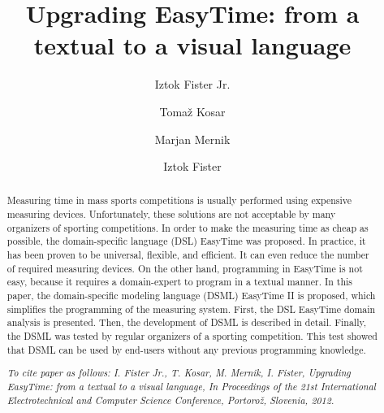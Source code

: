 \documentclass[preprint, prX]{revtex4}
\begin{document}
\begin{abstract}
Measuring time in mass sports competitions is usually performed using expensive measuring devices. Unfortunately, these solutions are not acceptable by many organizers of sporting competitions. In order to make the measuring time as cheap as possible, the domain-specific language (DSL) EasyTime was proposed. In practice, it has been proven to be universal, flexible, and efficient. It can even reduce the number of required measuring devices. On the other hand, programming in EasyTime is not easy, because it requires a domain-expert to program in a textual manner. In this paper, the domain-specific modeling language (DSML) EasyTime II is proposed, which simplifies the programming of the measuring system. First, the DSL EasyTime domain analysis is presented. Then, the development of DSML is described in detail. Finally, the DSML was tested by regular organizers of a sporting competition. This test showed that DSML can be used by end-users without any previous programming knowledge.

\textit{To cite paper as follows: I. Fister Jr., T. Kosar, M. Mernik, I. Fister, Upgrading EasyTime: from a textual to a visual language, In {\em Proceedings of the 21st International Electrotechnical and Computer Science Conference}, Portoro\v{z}, Slovenia, 2012.
}

\end{abstract}

\title{Upgrading EasyTime: from a textual to a visual language}


\author{Iztok Fister Jr.}


\author{Toma\v{z} Kosar}

\author{Marjan Mernik}

\author{Iztok Fister}


\maketitle
\end{document}
